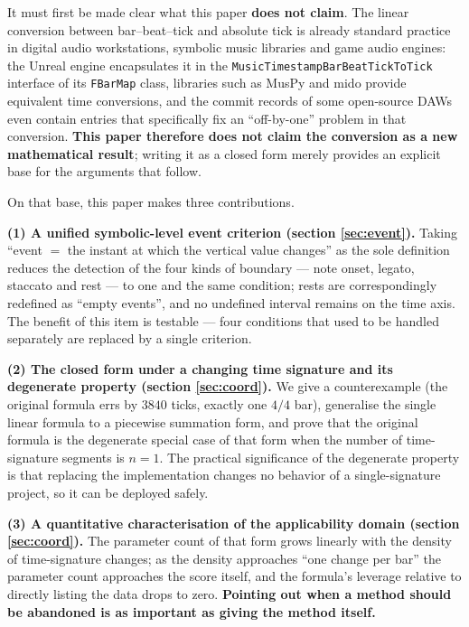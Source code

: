 \documentclass[11pt,a4paper]{article}
\begin{document}
It must first be made clear what this paper \textbf{does not claim}. The linear
conversion between bar--beat--tick and absolute tick is already standard practice in
digital audio workstations, symbolic music libraries and game audio engines: the Unreal
engine encapsulates it in the
\texttt{MusicTimestampBarBeatTickToTick} interface of its
\texttt{FBarMap} class, libraries such as MusPy and mido provide equivalent time
conversions, and the commit records of some open-source DAWs even contain entries that
specifically fix an ``off-by-one'' problem in that conversion. \textbf{This paper
therefore does not claim the conversion as a new mathematical result}; writing it as a
closed form merely provides an explicit base for the arguments that follow.

On that base, this paper makes three contributions.

\textbf{(1) A unified symbolic-level event criterion (section \ref{sec:event}).}
Taking ``event $=$ the instant at which the vertical value changes'' as the sole
definition reduces the detection of the four kinds of boundary --- note onset, legato,
staccato and rest --- to one and the same condition; rests are correspondingly
redefined as ``empty events'', and no undefined interval remains on the time axis. The
benefit of this item is testable --- four conditions that used to be handled separately
are replaced by a single criterion.

\textbf{(2) The closed form under a changing time signature and its degenerate
property (section \ref{sec:coord}).} We give a counterexample (the original formula
errs by $3840$ ticks, exactly one $4/4$ bar), generalise the single linear formula to a
piecewise summation form, and prove that the original formula is the degenerate special
case of that form when the number of time-signature segments is $n=1$. The practical
significance of the degenerate property is that replacing the implementation changes no
behavior of a single-signature project, so it can be deployed safely.

\textbf{(3) A quantitative characterisation of the applicability domain (section
\ref{sec:coord}).} The parameter count of that form grows linearly with the density of
time-signature changes; as the density approaches ``one change per bar'' the parameter
count approaches the score itself, and the formula's leverage relative to directly
listing the data drops to zero.
\textbf{Pointing out when a method should be abandoned is as important as giving the
method itself.}
\end{document}
